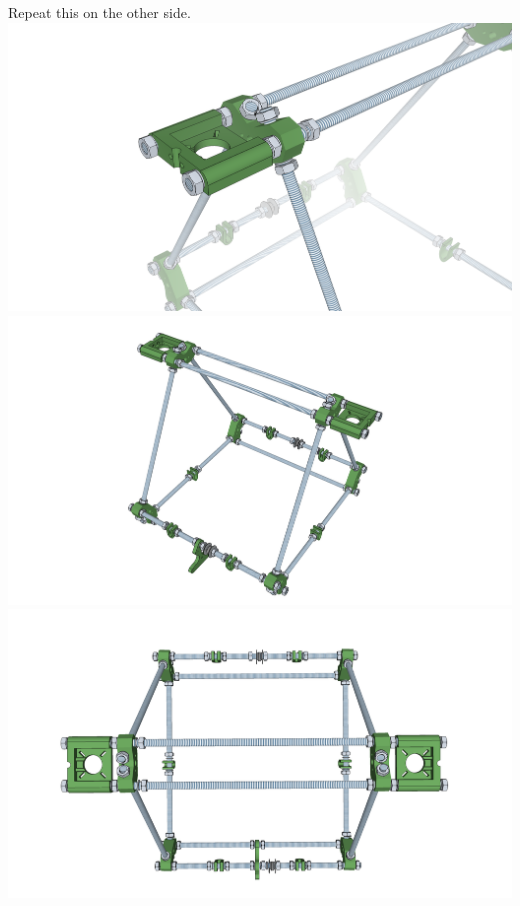 \documentclass[twoside,a4paper,titlepage]{memoir}
\begin{document}
	\section{}
	Repeat this on the other side.\\
	\includegraphics[width=1\linewidth]{graphics/ch4_6_1.png}
	\includegraphics[width=1\linewidth]{graphics/ch4_6_2.png}
	\includegraphics[width=1\linewidth]{graphics/ch4_6_3.png}
	
\end{document}
